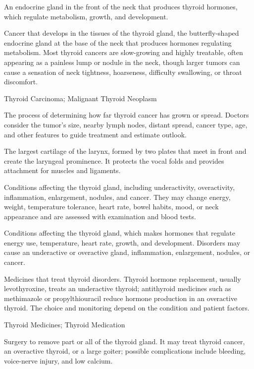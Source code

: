  An endocrine gland in the front of the neck that produces thyroid hormones, which regulate metabolism, growth, and development.

 Cancer that develops in the tissues of the thyroid gland, the butterfly-shaped endocrine gland at the base of the neck that produces hormones regulating metabolism. Most thyroid cancers are slow-growing and highly treatable, often appearing as a painless lump or nodule in the neck, though larger tumors can cause a sensation of neck tightness, hoarseness, difficulty swallowing, or throat discomfort.


\synonyms
Thyroid Carcinoma; Malignant Thyroid Neoplasm

 The process of determining how far thyroid cancer has grown or spread. Doctors consider the tumor’s size, nearby lymph nodes, distant spread, cancer type, age, and other features to guide treatment and estimate outlook.

 The largest cartilage of the larynx, formed by two plates that meet in front and create the laryngeal prominence. It
protects the vocal folds and provides attachment for muscles and ligaments.

 Conditions affecting the thyroid gland, including underactivity, overactivity, inflammation, enlargement, nodules, and cancer. They may change energy, weight, temperature tolerance, heart rate, bowel habits, mood, or neck appearance and are assessed with examination and blood tests.

 Conditions affecting the thyroid gland, which makes hormones that regulate energy use, temperature, heart rate, growth, and development. Disorders may cause an underactive or overactive gland, inflammation, enlargement, nodules, or cancer.

 Medicines that treat thyroid disorders. Thyroid hormone replacement, usually levothyroxine, treats an underactive thyroid; antithyroid medicines such as methimazole or propylthiouracil reduce hormone production in an overactive thyroid. The choice and monitoring depend on the condition and patient factors.

\synonyms
Thyroid Medicines; Thyroid Medication

 Surgery to remove part or all of the thyroid gland. It may treat thyroid cancer, an overactive thyroid, or a large goiter; possible complications include bleeding, voice-nerve injury, and low calcium.

